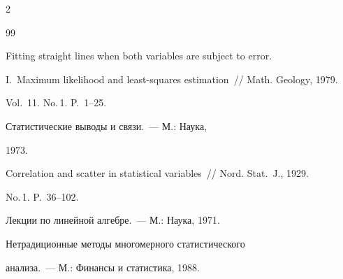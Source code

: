 \begin{multicols}{2}
{{\begin{thebibliography}{99}

 Fitting straight lines when both variables are subject to error.

I.~Maximum likelihood and least-squares estimation~// Math. Geology, 1979.

Vol.~11. No.\,1. P.~1--25.


 Статистические выводы и связи.~--- М.: Наука,

1973.


 Correlation and scatter in statistical variables~// Nord. Stat.~J., 1929.

No.\,1. P.~36--102.



\label{end\stat}




 Лекции по линейной алгебре.~--- М.: Наука, 1971.


 Нетрадиционные методы многомерного статистического

анализа.~--- М.: Финансы и статистика, 1988.

\end{thebibliography}



}

}





\end{multicols}

